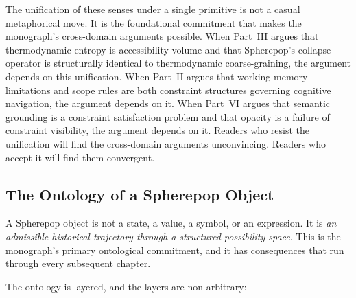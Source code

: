 \documentclass[12pt,openany]{book}
\theoremstyle{plain}
\theoremstyle{definition}
\theoremstyle{remark}
\begin{document}
The unification of these senses under a single primitive is not a casual metaphorical move. It is the foundational commitment that makes the monograph's cross-domain arguments possible. When Part~III argues that thermodynamic entropy is accessibility volume and that Spherepop's collapse operator is structurally identical to thermodynamic coarse-graining, the argument depends on this unification. When Part~II argues that working memory limitations and scope rules are both constraint structures governing cognitive navigation, the argument depends on it. When Part~VI argues that semantic grounding is a constraint satisfaction problem and that opacity is a failure of constraint visibility, the argument depends on it. Readers who resist the unification will find the cross-domain arguments unconvincing. Readers who accept it will find them convergent.

\subsection*{The Ontology of a Spherepop Object}

A Spherepop object is not a state, a value, a symbol, or an expression. It is \emph{an admissible historical trajectory through a structured possibility space}. This is the monograph's primary ontological commitment, and it has consequences that run through every subsequent chapter.

The ontology is layered, and the layers are non-arbitrary:
\end{document}
